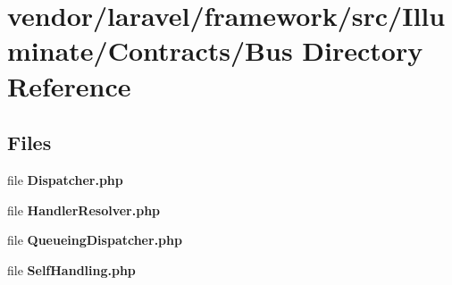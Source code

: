 \section{vendor/laravel/framework/src/\+Illuminate/\+Contracts/\+Bus Directory Reference}
\label{dir_67d3f17710d88204f29feae478249d84}
\subsection*{Files}
\begin{DoxyCompactItemize}
\item 
file {\bf Dispatcher.\+php}
\item 
file {\bf Handler\+Resolver.\+php}
\item 
file {\bf Queueing\+Dispatcher.\+php}
\item 
file {\bf Self\+Handling.\+php}
\end{DoxyCompactItemize}
